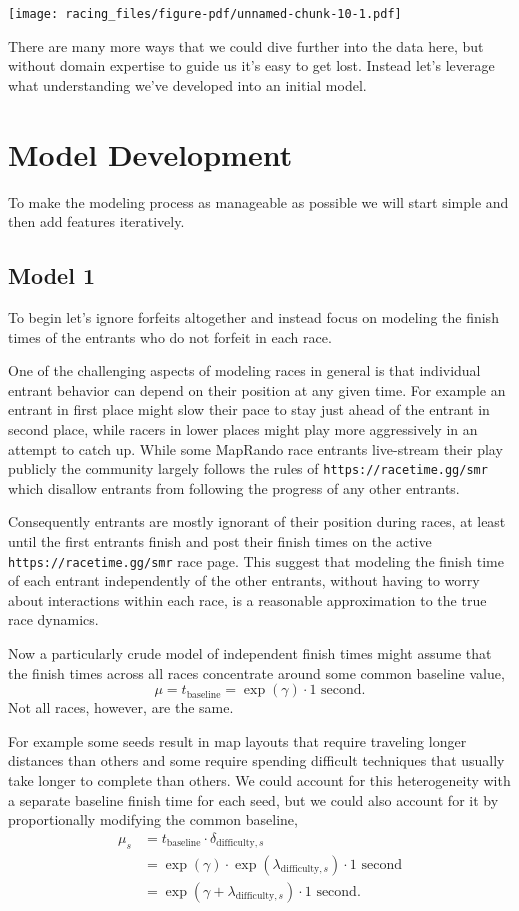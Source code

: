 \documentclass[
  letterpaper,
  DIV=11,
  numbers=noendperiod]{scrartcl}
\begin{document}
\texttt{[image: racing\_files/figure-pdf/unnamed-chunk-10-1.pdf]}

There are many more ways that we could dive further into the data here,
but without domain expertise to guide us it's easy to get lost. Instead
let's leverage what understanding we've developed into an initial model.

\section{Model Development}\label{model-development}

To make the modeling process as manageable as possible we will start
simple and then add features iteratively.

\subsection{Model 1}\label{model-1}

To begin let's ignore forfeits altogether and instead focus on modeling
the finish times of the entrants who do not forfeit in each race.

One of the challenging aspects of modeling races in general is that
individual entrant behavior can depend on their position at any given
time. For example an entrant in first place might slow their pace to
stay just ahead of the entrant in second place, while racers in lower
places might play more aggressively in an attempt to catch up. While
some MapRando race entrants live-stream their play publicly the
community largely follows the rules of \texttt{https://racetime.gg/smr}
which disallow entrants from following the progress of any other
entrants.

Consequently entrants are mostly ignorant of their position during
races, at least until the first entrants finish and post their finish
times on the active \texttt{https://racetime.gg/smr} race page. This
suggest that modeling the finish time of each entrant independently of
the other entrants, without having to worry about interactions within
each race, is a reasonable approximation to the true race dynamics.

Now a particularly crude model of independent finish times might assume
that the finish times across all races concentrate around some common
baseline value, \[
\mu = t_{\mathrm{baseline}} = \exp(\gamma) \cdot 1 \text{ second}.
\] Not all races, however, are the same.

For example some seeds result in map layouts that require traveling
longer distances than others and some require spending difficult
techniques that usually take longer to complete than others. We could
account for this heterogeneity with a separate baseline finish time for
each seed, but we could also account for it by proportionally modifying
the common baseline, \begin{align*}
\mu_{s}
&=
t_{\mathrm{baseline}} \cdot \delta_{\mathrm{difficulty}, s}
\\
&=
\exp(\gamma) \cdot \exp( \lambda_{\mathrm{difficulty}, s} )
\cdot 1 \text{ second}
\\
&=
\exp(\gamma + \lambda_{\mathrm{difficulty}, s}) \cdot 1 \text{ second}.
\end{align*}
\end{document}
